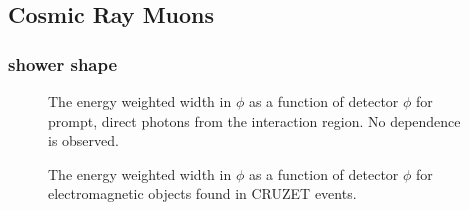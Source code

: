 \documentclass{cmspaper}
\begin{document}
\subsection{Cosmic Ray Muons}

\subsubsection{shower shape}

\begin{figure}[hbtp]
  \begin{center}
    \caption{The energy weighted width in $\phi$ as a function of detector $\phi$ for prompt, direct photons from the interaction region.  No dependence is observed.}
    \label{fig:PromptPhiWidPhi}
  \end{center}
\end{figure}

\begin{figure}[hbtp]
  \begin{center}
    \caption{The energy weighted width in $\phi$ as a function of detector $\phi$ for electromagnetic objects found in
CRUZET events.}
    \label{fig:CRUZETPhiWidPhi}
  \end{center}
\end{figure}
\end{document}
